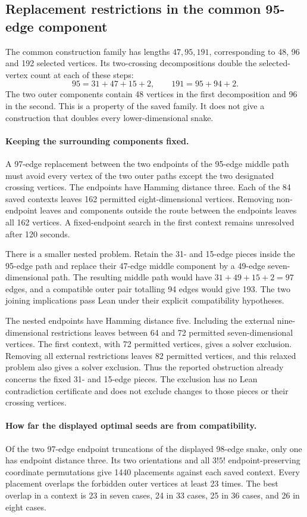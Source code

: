 \documentclass[11pt,a4paper]{article}
\theoremstyle{definition}
\theoremstyle{remark}
\begin{document}
\subsection{Replacement restrictions in the common 95-edge component}
\label{sec:middle-replacements}
The common construction family has lengths $47,95,191$, corresponding
to 48, 96 and 192 selected vertices. Its two-crossing decompositions
double the selected-vertex count at each of these steps:
\[
95=31+47+15+2,\qquad 191=95+94+2.
\]
The two outer components contain 48 vertices in the first decomposition
and 96 in the second. This is a property of the saved family. It does
not give a construction that doubles every lower-dimensional snake.

\paragraph{Keeping the surrounding components fixed.}
A 97-edge replacement between the two endpoints of the 95-edge middle
path must avoid every vertex of the two outer paths except the two
designated crossing vertices. The endpoints have Hamming distance three.
Each of the 84 saved contexts leaves 162 permitted eight-dimensional
vertices. Removing non-endpoint leaves and components outside the route
between the endpoints leaves all 162 vertices. A fixed-endpoint search
in the first context remains unresolved after 120 seconds.

There is a smaller nested problem. Retain the 31- and 15-edge pieces
inside the 95-edge path and replace their 47-edge middle component by
a 49-edge seven-dimensional path. The resulting middle path would
have $31+49+15+2=97$ edges, and a compatible outer pair totalling 94
edges would give 193. The two joining implications pass Lean under
their explicit compatibility hypotheses.

The nested endpoints have Hamming distance five. Including the external
nine-dimensional restrictions leaves between 64 and 72 permitted
seven-dimensional vertices. The first context, with 72 permitted
vertices, gives a solver exclusion. Removing all external restrictions
leaves 82 permitted vertices, and this relaxed problem also gives a
solver exclusion. Thus the reported obstruction already concerns the
fixed 31- and 15-edge pieces. The exclusion has no Lean contradiction
certificate and does not exclude changes to those pieces or their
crossing vertices.

\paragraph{How far the displayed optimal seeds are from compatibility.}
Of the two 97-edge endpoint truncations of the displayed 98-edge snake,
only one has endpoint distance three. Its two orientations and all
$3!5!$ endpoint-preserving coordinate permutations give 1440 placements
against each saved context. Every placement overlaps the forbidden
outer vertices at least 23 times. The best overlap in a context is
23 in seven cases, 24 in 33 cases, 25 in 36 cases, and 26 in eight cases.
\end{document}
